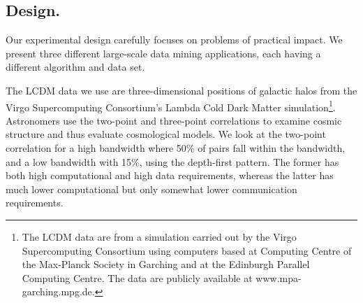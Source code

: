 \documentclass[twoside,leqno,twocolumn]{article}
\newcommand{\mysub}[1]{\subsection{#1.}}
\begin{document}
\mysub{Design}


Our experimental design carefully focuses on problems of practical impact.
We present three different large-scale data mining applications, each having a different algorithm and data set.


%
%
%


The LCDM data we use are three-dimensional positions of galactic halos from the Virgo Supercomputing Consortium's Lambda Cold Dark Matter simulation\footnote{
    The LCDM data are from a simulation carried out by the Virgo Supercomputing Consortium using computers based at Computing Centre of the Max-Planck Society in Garching and at the Edinburgh Parallel Computing Centre.
    The data are publicly available at www.mpa-garching.mpg.de.}.
Astronomers use the two-point and three-point correlations to examine cosmic structure and thus evaluate cosmological models.
We look at the two-point correlation for a high bandwidth where 50\% of pairs fall within the bandwidth, and a low bandwidth with 15\%, using the depth-first pattern.
The former has both high computational and high data requirements, whereas the latter has much lower computational but only somewhat lower communication requirements.
\end{document}
